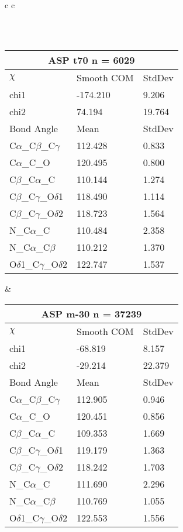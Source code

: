 \begin{longtable}{ c c }
\begin{tabular}{ l l l }
  \end{tabular}
  \\
  \begin{tabular}{ l l l }
  \toprule
  \multicolumn{3}{c}{ASP \textbf{t70} n = 6029} \\ \toprule
  $\chi$       & Smooth COM & StdDev \\ \midrule
  chi1 & -174.210 & 9.206 \\ 
  chi2 & 74.194 & 19.764 \\ \midrule
  Bond Angle   & Mean     & StdDev \\ \midrule
  C$\alpha$\_C$\beta$\_C$\gamma$ & 112.428 & 0.833\\
  C$\alpha$\_C\_O & 120.495 & 0.800\\
  C$\beta$\_C$\alpha$\_C & 110.144 & 1.274\\
  C$\beta$\_C$\gamma$\_O$\delta$1 & 118.490 & 1.114\\
  C$\beta$\_C$\gamma$\_O$\delta$2 & 118.723 & 1.564\\
  N\_C$\alpha$\_C & 110.484 & 2.358\\
  N\_C$\alpha$\_C$\beta$ & 110.212 & 1.370\\
  O$\delta$1\_C$\gamma$\_O$\delta$2 & 122.747 & 1.537\\
  \bottomrule
  \end{tabular}
  &
  \begin{tabular}{ l l l }
  \toprule
  \multicolumn{3}{c}{ASP \textbf{m-30} n = 37239} \\ \toprule
  $\chi$       & Smooth COM & StdDev \\ \midrule
  chi1 & -68.819 & 8.157 \\ 
  chi2 & -29.214 & 22.379 \\ \midrule
  Bond Angle   & Mean     & StdDev \\ \midrule
  C$\alpha$\_C$\beta$\_C$\gamma$ & 112.905 & 0.946\\
  C$\alpha$\_C\_O & 120.451 & 0.856\\
  C$\beta$\_C$\alpha$\_C & 109.353 & 1.669\\
  C$\beta$\_C$\gamma$\_O$\delta$1 & 119.179 & 1.363\\
  C$\beta$\_C$\gamma$\_O$\delta$2 & 118.242 & 1.703\\
  N\_C$\alpha$\_C & 111.690 & 2.296\\
  N\_C$\alpha$\_C$\beta$ & 110.769 & 1.055\\
  O$\delta$1\_C$\gamma$\_O$\delta$2 & 122.553 & 1.556\\
  \bottomrule
  \end{tabular}
  \\
  
\end{longtable}    

